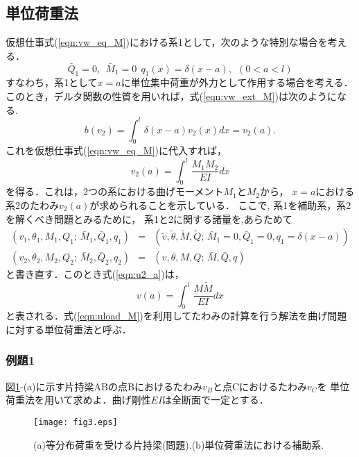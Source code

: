\documentclass[10pt,a4j]{jarticle}
\begin{document}
\subsection{単位荷重法}
仮想仕事式(\ref{eqn:vw_eq_M})における系1として，次のような特別な場合を考える．
\begin{equation}
	\bar Q_1=0,\ \ \bar M_1=0\ \ q_1(x)=\delta(x-a), \ \ (0<a<l)
	\label{eqn:sys1_M}
\end{equation}
すなわち，系1として$x=a$に単位集中荷重が外力として作用する場合を考える．
このとき，デルタ関数の性質を用いれば，式(\ref{eqn:vw_ext_M})は次のようになる. 
\begin{equation}
	b(v_2)=\int_0^l \delta(x-a)v_2(x)dx= v_2(a).
	\label{eqn:vw_eq_dlt}
\end{equation}
これを仮想仕事式(\ref{eqn:vw_eq_M})に代入すれば，
\begin{equation}
	v_2(a)=\int_0^l \frac{M_1M_2}{EI}dx
	\label{eqn:u2_a}
\end{equation}
を得る．これは，2つの系における曲げモーメント$M_1$と$M_2$から，
$x=a$における系2のたわみ$v_2(a)$が求められることを示している．
ここで, 系1を補助系，系2を解くべき問題とみるために，
系1と2に関する諸量を,あらためて 
\begin{eqnarray}
	\left( v_1, \theta_1, M_1, Q_1;\, \bar M_1, \bar Q_1, q_1 \right)& = &
		\left(\tilde v, \tilde \theta, \tilde M, \tilde Q;\, 
		\bar M_1=0, \bar Q_1=0, q_1= \delta(x-a) \right) 
	\label{eqn:aux}
	\\
	\left( v_2, \theta_2, M_2, Q_2 ;\, \bar M_2, \bar Q_2, q_2 \right)& = &
		\left( v,\theta,M, Q;\, \bar M,\bar Q, q \right) 
	\label{eqn:prb_M}
\end{eqnarray}
と書き直す．このとき式(\ref{eqn:u2_a})は，
\begin{equation}
	v(a)=\int_0^l \frac{M \tilde M}{EI}dx
	\label{eqn:uload_M}
\end{equation}
と表される．式(\ref{eqn:uload_M})を利用してたわみの計算を行う解法を曲げ問題に対する単位荷重法と呼ぶ．
\subsubsection{例題1}
図\ref{fig:fig2_3}-(a)に示す片持梁ABの点Bにおけるたわみ$v_B$と点Cにおけるたわみ$v_C$を
単位荷重法を用いて求めよ．曲げ剛性$EI$は全断面で一定とする．
\begin{figure}[h]
	\begin{center}
	\texttt{[image: fig3.eps]} 
	\end{center}
	\caption{(a)等分布荷重を受ける片持梁(問題).(b)単位荷重法における補助系.} 
	\label{fig:fig2_3}
\end{figure}
\end{document}

